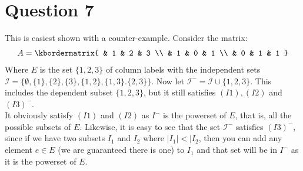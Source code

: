 \documentclass[a4paper, fleqn]{article}
\begin{document}
\section*{Question 7}
This is easiest shown with a counter-example. Consider the matrix:
\begin{align*}
  A=\kbordermatrix{
    & 1 & 2 & 3 \\
    & 1 & 0 & 1 \\
    & 0 & 1 & 1
  }
\end{align*}
Where $E$ is the set $\{1,2,3\}$ of column labels with the independent sets $\mathcal{I}=\{\emptyset, \{1\}, \{2\}, \{3\}, \{1,2\}, \{1,3\}. \{2,3\}\}$. Now let $\mathcal{I}^-=\mathcal{I}\cup \{1,2,3\}$. This includes the dependent subset $\{1,2,3\}$, but it still satisfies $(I1), (I2)$ and $(I3)^-$. \\
It obviously satisfy $(I1)$ and $(I2)$ as $I^-$ is the powerset of $E$, that is, all the possible subsets of $E$. Likewise, it is easy to see that the set $\mathcal{I}^-$ satisfies $(I3)^-$, since if we have two subsets $I_1$ and $I_2$ where $|I_1|<|I_2$, then you can add any element $e\in E$ (we are guaranteed there is one) to $I_1$ and that set will be in $I^-$ as it is the powerset of $E$.
\end{document}

